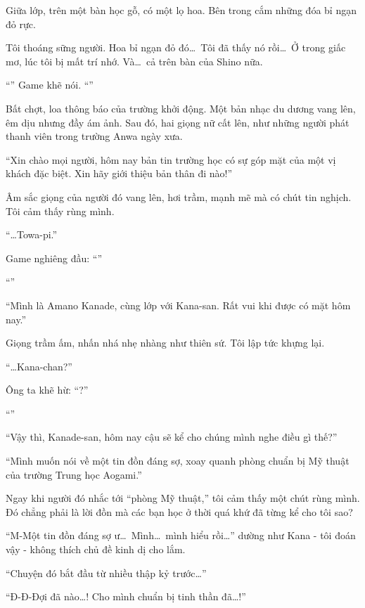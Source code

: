 \documentclass[../main.tex]{subfiles}
\begin{document}
Giữa lớp, trên một bàn học gỗ, có một lọ hoa. Bên trong cắm những đóa bỉ ngạn đỏ rực.

Tôi thoáng sững người. Hoa bỉ ngạn đỏ đó\dots\ Tôi đã thấy nó rồi\dots\ Ở trong giấc mơ, lúc tôi bị mất trí nhớ. Và\dots\ cả trên bàn của Shino nữa.

``'' Game khẽ nói. ``''

Bất chợt, loa thông báo của trường khởi động. Một bản nhạc du dương vang lên, êm dịu nhưng đầy ám ảnh. Sau đó, hai giọng nữ cất lên, như những người phát thanh viên trong trường Anwa ngày xưa.

``Xin chào mọi người, hôm nay bản tin trường học có sự góp mặt của một vị khách đặc biệt. Xin hãy giới thiệu bản thân đi nào!''

Âm sắc giọng của người đó vang lên, hơi trầm, mạnh mẽ mà có chút tin nghịch. Tôi cảm thấy rùng mình.

``\dots Towa-pi.''

Game nghiêng đầu: ``''

``''

``Mình là Amano Kanade, cùng lớp với Kana-san. Rất vui khi được có mặt hôm nay.''

Giọng trầm ấm, nhấn nhá nhẹ nhàng như thiên sứ. Tôi lập tức khựng lại.

``\dots Kana-chan?''

Ông ta khẽ hừ: ``?''

``''

``Vậy thì, Kanade-san, hôm nay cậu sẽ kể cho chúng mình nghe điều gì thế?''

``Mình muốn nói về một tin đồn đáng sợ, xoay quanh phòng chuẩn bị Mỹ thuật của trường Trung học Aogami.''

Ngay khi người đó nhắc tới ``phòng Mỹ thuật,'' tôi cảm thấy một chút rùng mình. Đó chẳng phải là lời đồn mà các bạn học ở thời quá khứ đã từng kể cho tôi sao?

``M-Một tin đồn đáng sợ ư\dots\  Mình\dots\ mình hiểu rồi\dots'' dường như Kana - tôi đoán vậy - không thích chủ đề kinh dị cho lắm.

``Chuyện đó bắt đầu từ nhiều thập kỷ trước\dots''

``Đ-Đ-Đợi đã nào\dots! Cho mình chuẩn bị tinh thần đã\dots!''
\end{document}
